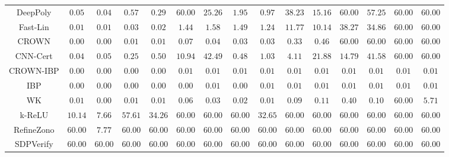 \begin{table*}
{\begin{tabular}{c|c|c|c|c|c|c|c|c|c|c|c|c|c|c}
     DeepPoly &        $0.05$ &        $0.04$ &        $0.57$ &        $0.29$ &       $60.00$ &       $25.26$ &        $1.95$ &        $0.97$ &       $38.23$ &       $15.16$ &       $60.00$ &       $57.25$ &       $60.00$ &       $60.00$ \\
     Fast-Lin &        $0.01$ &        $0.01$ &        $0.03$ &        $0.02$ &        $1.44$ &        $1.58$ &        $1.49$ &        $1.24$ &       $11.77$ &       $10.14$ &       $38.27$ &       $34.86$ &       $60.00$ &       $60.00$ \\
        CROWN &        $0.00$ &        $0.00$ &        $0.01$ &        $0.01$ &        $0.07$ &        $0.04$ &        $0.03$ &        $0.03$ &        $0.33$ &        $0.46$ &       $60.00$ &       $60.00$ &       $60.00$ &       $60.00$ \\
     CNN-Cert &        $0.04$ &        $0.05$ &        $0.25$ &        $0.50$ &       $10.94$ &       $42.49$ &        $0.48$ &        $1.03$ &        $4.11$ &       $21.88$ &       $14.79$ &       $41.58$ &       $60.00$ &       $60.00$ \\
    CROWN-IBP &        $0.00$ &        $0.00$ &        $0.00$ &        $0.00$ &        $0.01$ &        $0.01$ &        $0.01$ &        $0.01$ &        $0.01$ &        $0.01$ &        $0.01$ &        $0.01$ &        $0.01$ &        $0.01$ \\
          IBP &        $0.00$ &        $0.00$ &        $0.00$ &        $0.00$ &        $0.00$ &        $0.01$ &        $0.00$ &        $0.01$ &        $0.01$ &        $0.01$ &        $0.01$ &        $0.01$ &        $0.01$ &        $0.01$ \\
           WK &        $0.01$ &        $0.00$ &        $0.01$ &        $0.01$ &        $0.06$ &        $0.03$ &        $0.02$ &        $0.01$ &        $0.09$ &        $0.11$ &        $0.40$ &        $0.10$ &       $60.00$ &        $5.71$ \\
       k-ReLU &       $10.14$ &        $7.66$ &       $57.61$ &       $34.26$ &       $60.00$ &       $60.00$ &       $60.00$ &       $32.65$ &       $60.00$ &       $60.00$ &       $60.00$ &       $60.00$ &       $60.00$ &       $60.00$ \\
   RefineZono &       $60.00$ &        $7.77$ &       $60.00$ &       $60.00$ &       $60.00$ &       $60.00$ &       $60.00$ &       $60.00$ &       $60.00$ &       $60.00$ &       $60.00$ &       $60.00$ &       $60.00$ &       $60.00$ \\
    SDPVerify &       $60.00$ &       $60.00$ &       $60.00$ &       $60.00$ &       $60.00$ &       $60.00$ &       $60.00$ &       $60.00$ &       $60.00$ &       $60.00$ &       $60.00$ &       $60.00$ &       $60.00$ &       $60.00$ \\

\end{tabular}}
\end{table*}
